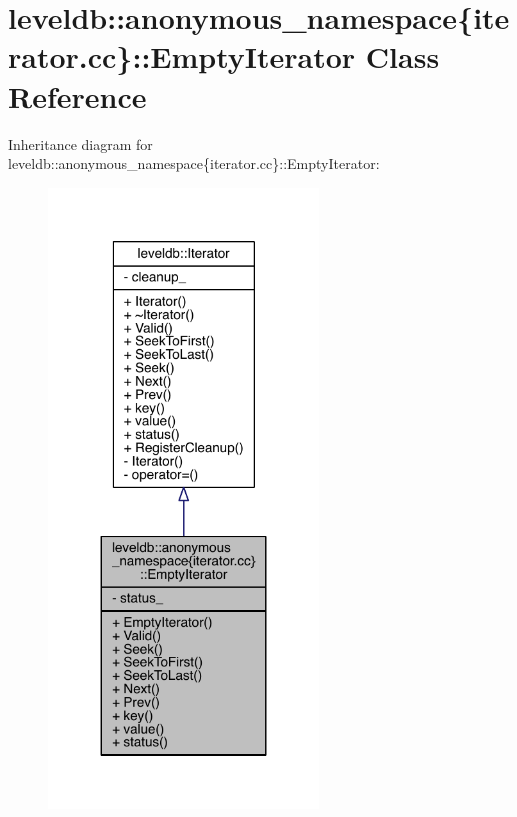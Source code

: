\hypertarget{classleveldb_1_1anonymous__namespace_02iterator_8cc_03_1_1_empty_iterator}{}\section{leveldb\+:\+:anonymous\+\_\+namespace\{iterator.\+cc\}\+:\+:Empty\+Iterator Class Reference}
\label{classleveldb_1_1anonymous__namespace_02iterator_8cc_03_1_1_empty_iterator}


Inheritance diagram for leveldb\+:\+:anonymous\+\_\+namespace\{iterator.\+cc\}\+:\+:Empty\+Iterator\+:
\nopagebreak
\begin{figure}[H]
\begin{center}
\leavevmode
\includegraphics[width=203pt]{classleveldb_1_1anonymous__namespace_02iterator_8cc_03_1_1_empty_iterator__inherit__graph}
\end{center}
\end{figure}


